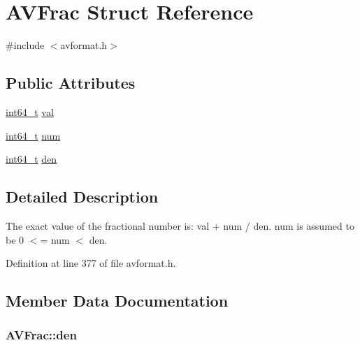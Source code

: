\hypertarget{struct_a_v_frac}{}\section{A\+V\+Frac Struct Reference}
\label{struct_a_v_frac}


{\ttfamily \#include $<$avformat.\+h$>$}

\subsection*{Public Attributes}
\begin{DoxyCompactItemize}
\item 
\hyperlink{lib-src_2ffmpeg_2win32_2stdint_8h_a67a9885ef4908cb72ce26d75b694386c}{int64\+\_\+t} \hyperlink{struct_a_v_frac_ad8a9fbef2ecee98544521815af4bb4b1}{val}
\item 
\hyperlink{lib-src_2ffmpeg_2win32_2stdint_8h_a67a9885ef4908cb72ce26d75b694386c}{int64\+\_\+t} \hyperlink{struct_a_v_frac_a9203429f247637d5819f1feb05c47009}{num}
\item 
\hyperlink{lib-src_2ffmpeg_2win32_2stdint_8h_a67a9885ef4908cb72ce26d75b694386c}{int64\+\_\+t} \hyperlink{struct_a_v_frac_a1a56f998e04f22ca35e4385a06a04812}{den}
\end{DoxyCompactItemize}


\subsection{Detailed Description}
The exact value of the fractional number is\+: \textquotesingle{}val + num / den\textquotesingle{}. num is assumed to be 0 $<$= num $<$ den. 

Definition at line 377 of file avformat.\+h.



\subsection{Member Data Documentation}
\subsubsection[{\texorpdfstring{den}{den}}]{ A\+V\+Frac\+::den}\hypertarget{struct_a_v_frac_a1a56f998e04f22ca35e4385a06a04812}{}\label{struct_a_v_frac_a1a56f998e04f22ca35e4385a06a04812}


